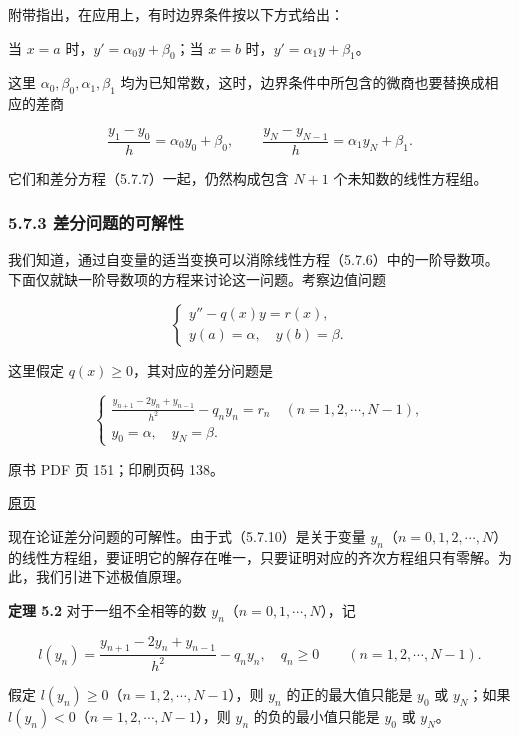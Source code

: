 附带指出，在应用上，有时边界条件按以下方式给出：

当 \(x=a\) 时，\(y'=\alpha_0y+\beta_0\)；当 \(x=b\) 时，\(y'=\alpha_1y+\beta_1\)。

这里 \(\alpha_0,\beta_0,\alpha_1,\beta_1\) 均为已知常数，这时，边界条件中所包含的微商也要替换成相应的差商

\[
\frac{y_1-y_0}{h}=\alpha_0y_0+\beta_0,\qquad
\frac{y_N-y_{N-1}}h=\alpha_1y_N+\beta_1.
\]

它们和差分方程（5.7.7）一起，仍然构成包含 \(N+1\) 个未知数的线性方程组。

\subsubsection{5.7.3 差分问题的可解性}\label{ch05b-ux5deeux5206ux95eeux9898ux7684ux53efux89e3ux6027}

我们知道，通过自变量的适当变换可以消除线性方程（5.7.6）中的一阶导数项。下面仅就缺一阶导数项的方程来讨论这一问题。考察边值问题

\[
\begin{cases}
y''-q(x)y=r(x),\\
y(a)=\alpha,\quad y(b)=\beta.
\end{cases}
\tag{5.7.9}
\]

这里假定 \(q(x)\ge0\)，其对应的差分问题是

\[
\begin{cases}
\displaystyle\frac{y_{n+1}-2y_n+y_{n-1}}{h^2}-q_ny_n=r_n\quad(n=1,2,\cdots,N-1),\\[6pt]
y_0=\alpha,\quad y_N=\beta.
\end{cases}
\tag{5.7.10}
\]

\clearpage

原书 PDF 页 151；印刷页码 138。

\href{source-images/pdf-151.jpeg}{原页}

现在论证差分问题的可解性。由于式（5.7.10）是关于变量 \(y_n\)（\(n=0,1,2,\cdots,N\)）的线性方程组，要证明它的解存在唯一，只要证明对应的齐次方程组只有零解。为此，我们引进下述极值原理。

\textbf{定理 5.2} 对于一组不全相等的数 \(y_n\)（\(n=0,1,\cdots,N\)），记

\[
l(y_n)=\frac{y_{n+1}-2y_n+y_{n-1}}{h^2}-q_ny_n,\quad q_n\ge0\qquad(n=1,2,\cdots,N-1).
\]

假定 \(l(y_n)\ge0\)（\(n=1,2,\cdots,N-1\)），则 \(y_n\) 的正的最大值只能是 \(y_0\) 或 \(y_N\)；如果 \(l(y_n)<0\)（\(n=1,2,\cdots,N-1\)），则 \(y_n\) 的负的最小值只能是 \(y_0\) 或 \(y_N\)。

